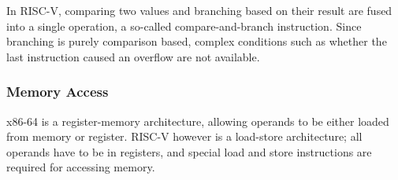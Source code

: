 In RISC-V, comparing two values and branching based on their result are fused into a single operation, a so-called compare-and-branch instruction. Since branching is purely comparison based, complex conditions such as whether the last instruction caused an overflow are not available.

\subsubsection{Memory Access}
x86-64 is a register-memory architecture, allowing operands to be either loaded from memory or register. RISC-V however is a load-store architecture; all operands have to be in registers, and special load and store instructions are required for accessing memory.
